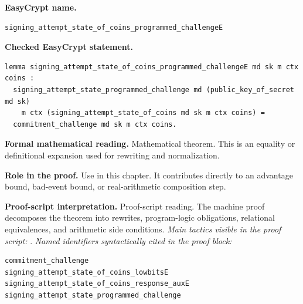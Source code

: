 \begin{formaltheorem}
\noindent\textbf{EasyCrypt name.}
\begin{lstlisting}[language=EasyCrypt,basicstyle=\ttfamily\scriptsize]
signing_attempt_state_of_coins_programmed_challengeE
\end{lstlisting}
\noindent\textbf{Checked EasyCrypt statement.}
\begin{lstlisting}[language=EasyCrypt,basicstyle=\ttfamily\scriptsize]
lemma signing_attempt_state_of_coins_programmed_challengeE md sk m ctx coins :
  signing_attempt_state_programmed_challenge md (public_key_of_secret md sk)
    m ctx (signing_attempt_state_of_coins md sk m ctx coins) =
  commitment_challenge md sk m ctx coins.
\end{lstlisting}
\noindent\textbf{Formal mathematical reading.}
Mathematical theorem. This is an equality or definitional expansion used for rewriting and normalization.

\noindent\textbf{Role in the proof.}
Use in this chapter. It contributes directly to an advantage bound, bad-event bound, or real-arithmetic composition step.

\noindent\textbf{Proof-script interpretation.}
Proof-script reading. The machine proof decomposes the theorem into rewrites, program-logic obligations, relational equivalences, and arithmetic side conditions.
\emph{Main tactics visible in the proof script:} .
\emph{Named identifiers syntactically cited in the proof block:}
\begin{lstlisting}[language=EasyCrypt,basicstyle=\ttfamily\scriptsize]
commitment_challenge
signing_attempt_state_of_coins_lowbitsE
signing_attempt_state_of_coins_response_auxE
signing_attempt_state_programmed_challenge
\end{lstlisting}

\end{formaltheorem}

